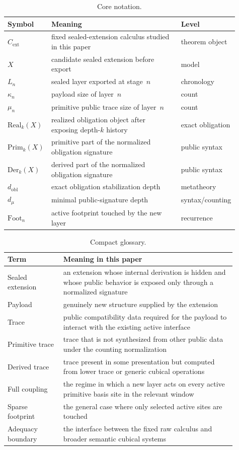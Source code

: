 \documentclass{lmcs}
\newcommand{\Real}{\mathrm{Real}}
\newcommand{\Prim}{\mathrm{Prim}}
\newcommand{\Der}{\mathrm{Der}}
\newcommand{\Foot}{\mathrm{Foot}}
\newcommand{\Cext}{C_{\mathrm{ext}}}
\begin{document}
\begin{table}[t]
\centering
\caption{Core notation.}
\label{tab:notation}
\small
\begin{tabular}{@{}p{0.18\linewidth}p{0.56\linewidth}p{0.17\linewidth}@{}}
\toprule
Symbol & Meaning & Level \\
\midrule
$\Cext$ & fixed sealed-extension calculus studied in this paper & theorem object \\
$X$ & candidate sealed extension before export & model \\
$L_n$ & sealed layer exported at stage~$n$ & chronology \\
$\kappa_n$ & payload size of layer~$n$ & count \\
$\mu_n$ & primitive public trace size of layer~$n$ & count \\
$\Real_k(X)$ & realized obligation object after exposing depth-$k$ history & exact obligation \\
$\Prim_k(X)$ & primitive part of the normalized obligation signature & public syntax \\
$\Der_k(X)$ & derived part of the normalized obligation signature & public syntax \\
$d_{\mathrm{obl}}$ & exact obligation stabilization depth & metatheory \\
$d_\mu$ & minimal public-signature depth & syntax/counting \\
$\Foot_n$ & active footprint touched by the new layer & recurrence \\
\bottomrule
\end{tabular}
\end{table}

\begin{table}[t]
\centering
\caption{Compact glossary.}
\label{tab:glossary}
\small
\begin{tabular}{@{}p{0.22\linewidth}p{0.68\linewidth}@{}}
\toprule
Term & Meaning in this paper \\
\midrule
Sealed extension & an extension whose internal derivation is hidden and whose public behavior is exposed only through a normalized signature \\
Payload & genuinely new structure supplied by the extension \\
Trace & public compatibility data required for the payload to interact with the existing active interface \\
Primitive trace & trace that is not synthesized from other public data under the counting normalization \\
Derived trace & trace present in some presentation but computed from lower trace or generic cubical operations \\
Full coupling & the regime in which a new layer acts on every active primitive basis site in the relevant window \\
Sparse footprint & the general case where only selected active sites are touched \\
Adequacy boundary & the interface between the fixed raw calculus and broader semantic cubical systems \\
\bottomrule
\end{tabular}
\end{table}
\end{document}
